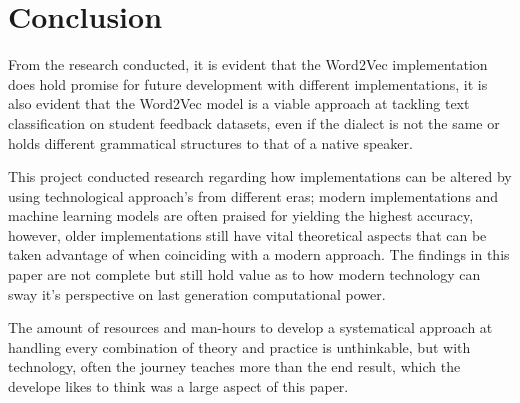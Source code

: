\chapter{Conclusion}

From the research conducted, it is evident that the Word2Vec implementation does hold promise for future development with different implementations, it is also evident that the Word2Vec model is a viable approach at tackling text classification on student feedback datasets, even if the dialect is not the same or holds different grammatical structures to that of a native speaker.

This project conducted research regarding how implementations can be altered by using technological approach's from different eras; modern implementations and machine learning models are often praised for yielding the highest accuracy, however, older implementations still have vital theoretical aspects that can be taken advantage of when coinciding with a modern approach. The findings in this paper are not complete but still hold value as to how modern technology can sway it's perspective on last generation computational power.

The amount of resources and man-hours to develop a systematical approach at handling every combination of theory and practice is unthinkable, but with technology, often the journey teaches more than the end result, which the develope likes to think was a large aspect of this paper.